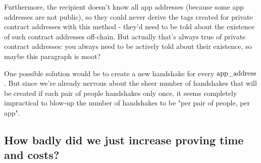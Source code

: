 Furthermore, the recipient doesn't know all app addresses (because some app addresses are not public), so they could never derive the tags created for private contract addresses with this method - they'd need to be told about the existence of such contract addresses off-chain. But actually that's always true of private contract addresses: you always need to be actively told about their existence, so maybe this paragraph is moot?

One possible solution would be to create a new handshake for every $\appaddress$.
But since we're already nervous about the sheer number of handshakes that will be created if each pair of people handshakes only once, it seems completely impractical to blow-up the number of handshakes to be "per pair of people, per app".


\subsection{How badly did we just increase proving time and costs?}

